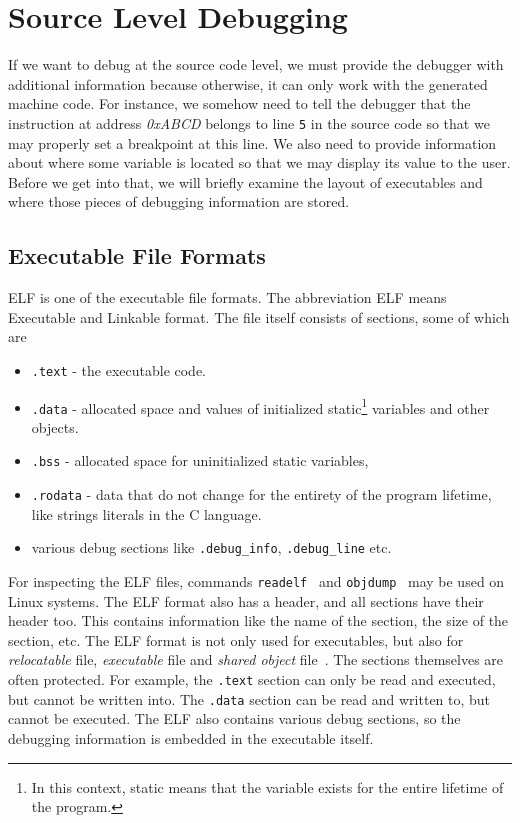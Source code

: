 \section{Source Level Debugging}\label{section:source-level-debugging}
If we want to debug at the source code level, we must provide the debugger with
additional information because otherwise, it can only work with the generated
machine code. For instance, we somehow need to tell the debugger that the
instruction at address \textit{0xABCD} belongs to line \texttt{5} in the source
code so that we may properly set a breakpoint at this line. We also need to
provide information about where some variable is located so that we may display
its value to the user. Before we get into that, we will briefly examine the
layout of executables and where those pieces of debugging information are
stored.

\subsection{Executable File Formats}\label{section:elf}
ELF is one of the executable file formats. The abbreviation ELF means
Executable and Linkable format. The file itself consists of sections, some of
which are
\begin{itemize}
    \item \texttt{.text} - the executable code.
    \item \texttt{.data} - allocated space and values of initialized
        static\footnote{In this context, static means that the variable exists
        for the entire lifetime of the program.} variables and other objects.
    \item \texttt{.bss} - allocated space for uninitialized static variables,
    \item \texttt{.rodata} - data that do not change for the entirety of the
        program lifetime, like strings literals in the C language.
    \item various debug sections like \verb|.debug_info|, \verb|.debug_line|
        etc.
\end{itemize}
For inspecting the ELF files, commands \texttt{readelf}~\cite{readelf} and
\texttt{objdump}~\cite{objdump} may be used on Linux systems. The ELF format
also has a header, and all sections have their header too. This contains
information like the name of the section, the size of the section, etc. The ELF
format is not only used for executables, but also for \textit{relocatable}
file, \textit{executable} file and \textit{shared object} file~\cite{elf}. The
sections themselves are often protected. For example, the \texttt{.text}
section can only be read and executed, but cannot be written into. The
\texttt{.data} section can be read and written to, but cannot be executed. The
ELF also contains various debug sections, so the debugging information is
embedded in the executable itself.

